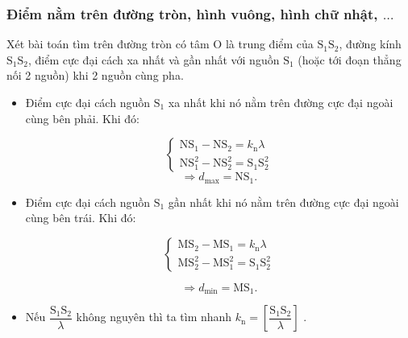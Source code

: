 \subsubsection{Điểm nằm trên đường tròn, hình vuông, hình chữ nhật, $\ldots$}
Xét bài toán tìm trên đường tròn có tâm O là trung điểm của $\text{S}_1\text{S}_2$, đường kính $\text{S}_1\text{S}_2$, điểm cực đại cách xa nhất và gần nhất với nguồn $\text{S}_1$ (hoặc tới đoạn thẳng nối 2 nguồn) khi 2 nguồn cùng pha.
\begin{itemize}
	\item Điểm cực đại cách nguồn $\text{S}_1$ xa nhất khi nó nằm trên đường cực đại ngoài cùng bên phải. Khi đó:
	
	\begin{equation*}
		\begin{cases}
			\text{NS}_1 - \text{NS}_2 =k_{\text{n}}\lambda \\
			\text{NS}_1^2 - \text{NS}_2^2=\text{S}_1\text{S}_2^2
		\end{cases}
	\end{equation*}
	\begin{equation*}
		\Rightarrow d_{\text{max}}=\text{NS}_1.
	\end{equation*}
	
	\item Điểm cực đại cách nguồn $\text{S}_1$ gần nhất khi nó nằm trên đường cực đại ngoài cùng bên trái. Khi đó:
	
	\begin{equation*}
		\begin{cases}
			\text{MS}_2 - \text{MS}_1 =k_{\text{n}}\lambda \\
			\text{MS}_2^2 - \text{MS}_1^2=\text{S}_1\text{S}_2^2
		\end{cases}
	\end{equation*}
	
	\begin{equation*}
		\Rightarrow d_{\text{min}}=\text{MS}_1.
	\end{equation*}
	
	\item Nếu $\dfrac{\text{S}_1\text{S}_2}{\lambda}$ không nguyên thì ta tìm nhanh $k_{\text{n}} = \left[\dfrac{\text{S}_1\text{S}_2}{\lambda}\right]$ .
	
\end{itemize}
